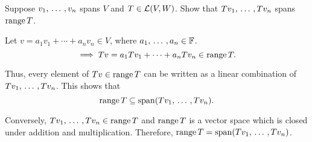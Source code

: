 \begin{xrcs}
  Suppose $v_1, {\, \ldots \,\,}, v_n$ spans $V$ and $T \in \mathcal{L}(V,W)$. Show that $Tv_1, {\, \ldots \,\,}, Tv_n$ spans $\operatorname{range} T$.

  \begin{prf}
    Let $v = a_1 v_1 + \cdots + a_n v_n \in V$, where $a_1, {\, \ldots \,\,}, a_n \in \mathbb{F}$.
    \begin{equation}
      \implies Tv = a_1 T v_1 + \cdots + a_n T v_n \in \operatorname{range} T.
    \end{equation}

    Thus, every element of $Tv \in \operatorname{range} T$ can be written as a linear combination of $Tv_1, {\, \ldots \,\,}, Tv_n$. This shows that
    \begin{equation}
      \operatorname{range} T \subseteq \operatorname{span} (T v_1, {\, \ldots \,\,}, T v_n).
    \end{equation}

    Conversely, \( Tv_1, {\, \ldots \,\,}, Tv_n \in \operatorname{range} T \) and $\operatorname{range} T$ is a vector space which is closed under addition and multiplication. Therefore, $\operatorname{range} T = \operatorname{span} (Tv_1, {\, \ldots \,\,}, Tv_n)$.
  \end{prf}
\end{xrcs}


